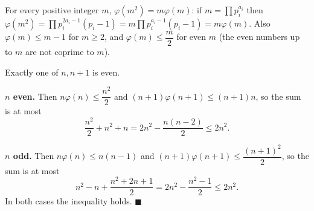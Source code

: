 For every positive integer $m$, $\varphi(m^2)=m\varphi(m)$: if $m=\prod p_i^{a_i}$ then $\varphi(m^2)=\prod p_i^{2a_i-1}(p_i-1)=m\prod p_i^{a_i-1}(p_i-1)=m\varphi(m)$. Also $\varphi(m)\le m-1$ for $m\ge2$, and $\varphi(m)\le\dfrac {m}{2}$ for even $m$ (the even numbers up to $m$ are not coprime to $m$).

Exactly one of $n,n+1$ is even.

\textbf{$n$ even.} Then $n\varphi(n)\le\dfrac{n^2}{2}$ and $(n+1)\varphi(n+1)\le(n+1)n$, so the sum is at most
\[
\dfrac{n^2}{2}+n^2+n=2n^2-\dfrac{n(n-2)}{2}\le2n^2 .
\]

\textbf{$n$ odd.} Then $n\varphi(n)\le n(n-1)$ and $(n+1)\varphi(n+1)\le\dfrac{(n+1)^2}{2}$, so the sum is at most
\[
n^2-n+\dfrac{n^2+2n+1}{2}=2n^2-\dfrac{n^2-1}{2}\le2n^2 .
\]
In both cases the inequality holds. $\blacksquare$
